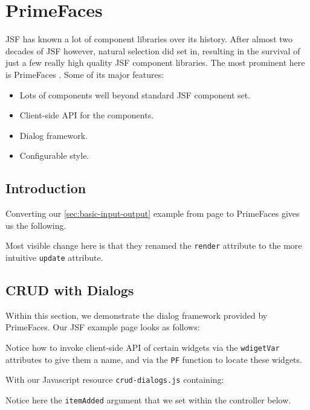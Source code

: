 %

\chapter{PrimeFaces}

JSF has known a lot of component libraries over its history.
After almost two decades of JSF however, natural selection did set in,
resulting in the survival of just a few really high quality JSF component libraries.
The most prominent here is PrimeFaces \cite{PrimeFaces}.
Some of its major features:
\begin{itemize}
	\item Lots of components well beyond standard JSF component set.
	\item Client-side API for the components.
	\item Dialog framework.
	\item Configurable style.
\end{itemize}

\section{Introduction}
Converting our \ref{sec:basic-input-output}  example from page \pageref{sec:basic-input-output} to PrimeFaces gives us the following.

Most visible change here is that they renamed the \texttt{render} attribute to the more intuitive \texttt{update} attribute.

\section{CRUD with Dialogs}
Within this section, we demonstrate the dialog framework provided by PrimeFaces.
Our JSF example page looks as follows:

Notice how to invoke client-side API of certain widgets via the \texttt{wdigetVar} attributes to give them a name, and via the \texttt{PF} function to locate these widgets.

With our Javascript resource \texttt{crud-dialogs.js} containing:

Notice here the \texttt{itemAdded} argument that we set within the controller below.

